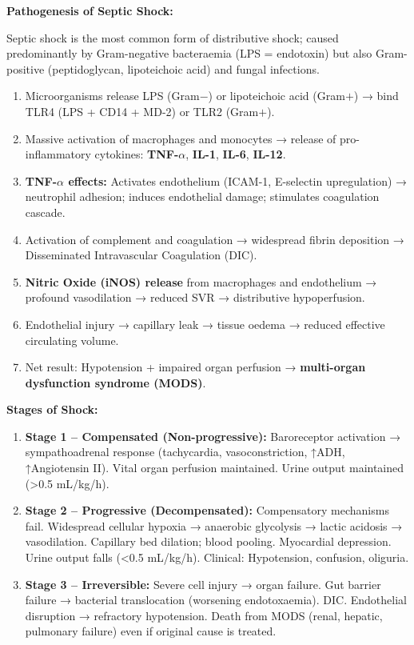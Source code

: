 \documentclass[11pt,a4paper]{article}
\begin{document}
\begin{ansbox}
\textbf{Pathogenesis of Septic Shock:}

Septic shock is the most common form of distributive shock; caused predominantly by Gram-negative bacteraemia (LPS = endotoxin) but also Gram-positive (peptidoglycan, lipoteichoic acid) and fungal infections.

\begin{enumerate}[leftmargin=*]
    \item Microorganisms release LPS (Gram$-$) or lipoteichoic acid (Gram$+$) → bind TLR4 (LPS + CD14 + MD-2) or TLR2 (Gram$+$).
    \item Massive activation of macrophages and monocytes → release of pro-inflammatory cytokines: \textbf{TNF-$\alpha$}, \textbf{IL-1}, \textbf{IL-6}, \textbf{IL-12}.
    \item \textbf{TNF-$\alpha$ effects:} Activates endothelium (ICAM-1, E-selectin upregulation) → neutrophil adhesion; induces endothelial damage; stimulates coagulation cascade.
    \item Activation of complement and coagulation → widespread fibrin deposition → Disseminated Intravascular Coagulation (DIC).
    \item \textbf{Nitric Oxide (iNOS) release} from macrophages and endothelium → profound vasodilation → reduced SVR → distributive hypoperfusion.
    \item Endothelial injury → capillary leak → tissue oedema → reduced effective circulating volume.
    \item Net result: Hypotension + impaired organ perfusion → \textbf{multi-organ dysfunction syndrome (MODS)}.
\end{enumerate}

\textbf{Stages of Shock:}
\begin{enumerate}[leftmargin=*]
    \item \textbf{Stage 1 -- Compensated (Non-progressive):} Baroreceptor activation → sympathoadrenal response (tachycardia, vasoconstriction, ↑ADH, ↑Angiotensin II). Vital organ perfusion maintained. Urine output maintained (\textgreater{}0.5 mL/kg/h).
    \item \textbf{Stage 2 -- Progressive (Decompensated):} Compensatory mechanisms fail. Widespread cellular hypoxia → anaerobic glycolysis → lactic acidosis → vasodilation. Capillary bed dilation; blood pooling. Myocardial depression. Urine output falls (\textless{}0.5 mL/kg/h). Clinical: Hypotension, confusion, oliguria.
    \item \textbf{Stage 3 -- Irreversible:} Severe cell injury → organ failure. Gut barrier failure → bacterial translocation (worsening endotoxaemia). DIC. Endothelial disruption → refractory hypotension. Death from MODS (renal, hepatic, pulmonary failure) even if original cause is treated.
\end{enumerate}


\end{ansbox}
\end{document}
